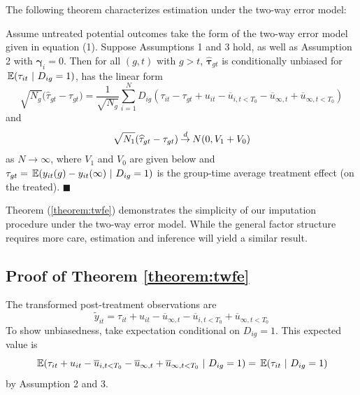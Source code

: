 \documentclass[12pt]{article}
\begin{document}
The following theorem characterizes estimation under the two-way error model:
\begin{theorem}\label{theorem:twfe}
    Assume untreated potential outcomes take the form of the two-way error model given in equation (1). Suppose Assumptions 1 and 3 hold, as well as Assumption 2 with $\bm \gamma_i = 0$. Then for all $(g, t)$ with $g > t$, $\widehat{\bm \tau}_{gt}$ is conditionally unbiased for $\expec{\tau_{it}}{D_{ig} = 1}$, has the linear form
    \begin{equation}\label{eq:twfe_influence}
        \sqrt{N_{g}} \big( \widehat{\tau}_{gt} - \tau_{gt} \big) 
        = \frac{1}{\sqrt{N_{g}}}\sum_{i=1}^N D_{ig} (\tau_{it} - \tau_{gt} + u_{it} - \overline{u}_{i,t < T_0} - \overline{u}_{\infty,t} + \overline{u}_{\infty,t < T_0})
    \end{equation}
    and  
    \begin{equation}\label{eq:twfe_asymptotic}
        \sqrt{N_1}(\widehat{\tau}_{gt} - \tau_{gt}) \mathbin{\overset{d}{\to}} N(0, V_1 + V_0)
    \end{equation}
    as $N \rightarrow \infty$, where $V_1$ and $V_0$ are given below and $\tau_{gt} = \expec{y_{it}(g) - y_{it}(\infty)}{D_{ig} = 1}$ is the group-time average treatment effect (on the treated). $\blacksquare$
\end{theorem}
Theorem (\ref{theorem:twfe}) demonstrates the simplicity of our imputation procedure under the two-way error model. While the general factor structure requires more care, estimation and inference will yield a similar result.


\subsection*{Proof of Theorem \ref{theorem:twfe}}

The transformed post-treatment observations are
\begin{equation}
    \tilde{y}_{it} = \tau_{it} + u_{it} - \overline{u}_{\infty,t}  - \overline{u}_{i,t < T_0} + \overline{u}_{\infty,t < T_0}
\end{equation}
To show unbiasedness, take expectation conditional on $D_{ig} = 1$. This expected value is
\begin{equation}
    \expec{ \tau_{it} + u_{it} - \overline{u}_{i,t < T_0} - \overline{u}_{\infty,t} + \overline{u}_{\infty,t < T_0} }{D_{ig} = 1} = \expec{\tau_{it}}{D_{ig} = 1}
\end{equation}
by Assumption 2 and 3.
\end{document}
